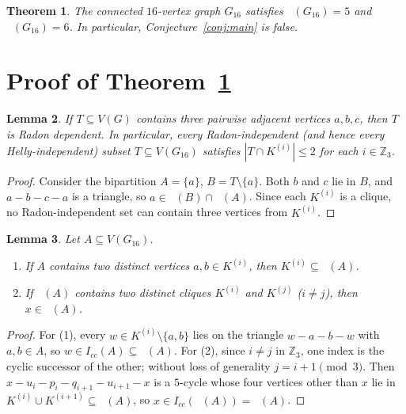 \documentclass[11pt,a4paper]{article}
\newtheorem{theorem}{Theorem}
\newtheorem{lemma}[theorem]{Lemma}
\DeclareMathOperator{\hl}{hl_{cc}}
\DeclareMathOperator{\rd}{rd_{cc}}
\DeclareMathOperator{\Hull}{Hull_{cc}}
\begin{document}
\begin{theorem}\label{thm:main}
The connected $16$-vertex graph $G_{16}$ satisfies $\hl(G_{16}) = 5$ and $\rd(G_{16}) = 6$. In particular, Conjecture~\ref{conj:main} is false.
\end{theorem}

\section{Proof of Theorem~\ref{thm:main}}

\begin{lemma}\label{lem:tri}
If $T \subseteq V(G)$ contains three pairwise adjacent vertices $a, b, c$, then $T$ is Radon dependent. In particular, every Radon-independent (and hence every Helly-independent) subset $T \subseteq V(G_{16})$ satisfies $|T \cap K^{(i)}| \le 2$ for each $i \in \mathbb{Z}_3$.
\end{lemma}

\begin{proof}
Consider the bipartition $A = \{a\}$, $B = T \setminus \{a\}$. Both $b$ and $c$ lie in $B$, and $a - b - c - a$ is a triangle, so $a \in \Hull(B) \cap \Hull(A)$. Since each $K^{(i)}$ is a clique, no Radon-independent set can contain three vertices from $K^{(i)}$.
\end{proof}

\begin{lemma}\label{lem:gen}
Let $A \subseteq V(G_{16})$.
\begin{enumerate}
\item If $A$ contains two distinct vertices $a, b \in K^{(i)}$, then $K^{(i)} \subseteq \Hull(A)$.
\item If $\Hull(A)$ contains two distinct cliques $K^{(i)}$ and $K^{(j)}$ ($i \neq j$), then $x \in \Hull(A)$.
\end{enumerate}
\end{lemma}

\begin{proof}
For (1), every $w \in K^{(i)} \setminus \{a, b\}$ lies on the triangle $w - a - b - w$ with $a, b \in A$, so $w \in I_{cc}(A) \subseteq \Hull(A)$. For (2), since $i \neq j$ in $\mathbb{Z}_3$, one index is the cyclic successor of the other; without loss of generality $j = i + 1 \pmod 3$. Then $x - u_i - p_i - q_{i+1} - u_{i+1} - x$ is a $5$-cycle whose four vertices other than $x$ lie in $K^{(i)} \cup K^{(i+1)} \subseteq \Hull(A)$, so $x \in I_{cc}(\Hull(A)) = \Hull(A)$.
\end{proof}
\end{document}
